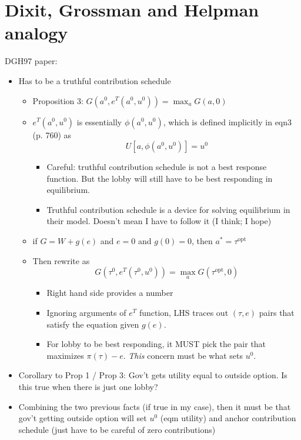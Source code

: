 \documentclass[12pt]{article}
\begin{document}
\section{Dixit, Grossman and Helpman analogy}
DGH97 paper:
\begin{itemize}
	\item Has to be a truthful contribution schedule
		\begin{itemize}
			\item Proposition 3: $G(a^0,e^T(a^0,u^0)) = \max_a G(a,0)$
			\item $e^T(a^0,u^0)$ is essentially $\phi(a^0,u^0)$, which is defined implicitly in eqn3 (p. 760) as
				\[
				  U\left[ a, \phi(a^0,u^0)\right] = u^0
				\]
					\begin{itemize}
						\item Careful: truthful contribution schedule is not a best response function. But the lobby will still have to be best responding in equilibrium.
						\item Truthful contribution schedule is a device for solving equilibrium in their model. Doesn't mean I have to follow it (I think; I hope)
					\end{itemize}
			\item if $G = W + g(e)$ and $e=0$ and $g(0) = 0$, then $a^* = \tau^{\text{opt}}$
			\item Then rewrite as 
				\[
				  G(\tau^0,e^T(\tau^0,u^0)) = \max_a G(\tau^{\text{opt}},0)
				\]
					\begin{itemize}
						\item Right hand side provides a number
						\item Ignoring arguments of $e^T$ function, LHS traces out $\left(\tau,e\right)$ pairs that satisfy the equation given $g(e)$.
						\item For lobby to be best responding, it MUST pick the pair that maximizes $\pi(\tau) - e$. \textit{This} concern must be what sets $u^0$.
					\end{itemize}
		\end{itemize}
	\item Corollary to Prop 1 / Prop 3: Gov't gets utility equal to outside option. Is this true when there is just one lobby?
	\item Combining the two previous facts (if true in my case), then it must be that gov't getting outside option will set $u^0$ (eqm utility) and anchor contribution schedule (just have to be careful of zero contributions)
\end{itemize}
\end{document}
